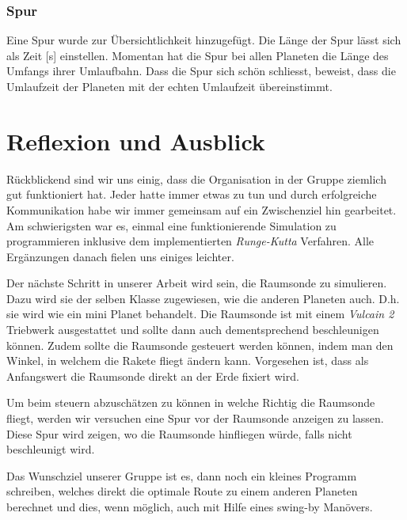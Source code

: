 \documentclass{article}
\begin{document}
\subsubsection{Spur}
Eine Spur wurde zur Übersichtlichkeit hinzugefügt. Die Länge der Spur lässt sich als Zeit [s] einstellen. Momentan hat die Spur bei allen Planeten die Länge des Umfangs ihrer Umlaufbahn. Dass die Spur sich schön schliesst, beweist, dass die Umlaufzeit der Planeten mit der echten Umlaufzeit übereinstimmt.


\section{Reflexion und Ausblick}
Rückblickend sind wir uns einig, dass die Organisation in der Gruppe ziemlich gut funktioniert hat. Jeder hatte immer etwas zu tun und durch erfolgreiche Kommunikation habe wir immer gemeinsam auf ein Zwischenziel hin gearbeitet. Am schwierigsten war es, einmal eine funktionierende Simulation zu programmieren inklusive dem implementierten \textit{Runge-Kutta} Verfahren. Alle Ergänzungen danach fielen uns einiges leichter. 


Der nächste Schritt in unserer Arbeit wird sein, die Raumsonde zu simulieren. Dazu wird sie der selben Klasse zugewiesen, wie die anderen Planeten auch. D.h. sie wird wie ein mini Planet behandelt. Die Raumsonde ist mit einem \textit{Vulcain 2} Triebwerk ausgestattet und sollte dann auch dementsprechend beschleunigen können. Zudem sollte die Raumsonde gesteuert werden können, indem man den Winkel, in welchem die Rakete fliegt ändern kann. Vorgesehen ist, dass als Anfangswert die Raumsonde direkt an der Erde fixiert wird. 

Um beim steuern abzuschätzen zu können in welche Richtig die Raumsonde fliegt, werden wir versuchen eine Spur vor der Raumsonde anzeigen zu lassen. Diese Spur wird zeigen, wo die Raumsonde hinfliegen würde, falls nicht beschleunigt wird.

Das Wunschziel unserer Gruppe ist es, dann noch ein kleines Programm schreiben, welches direkt die optimale Route zu einem anderen Planeten berechnet und dies, wenn möglich, auch mit Hilfe eines swing-by Manövers.
\end{document}
